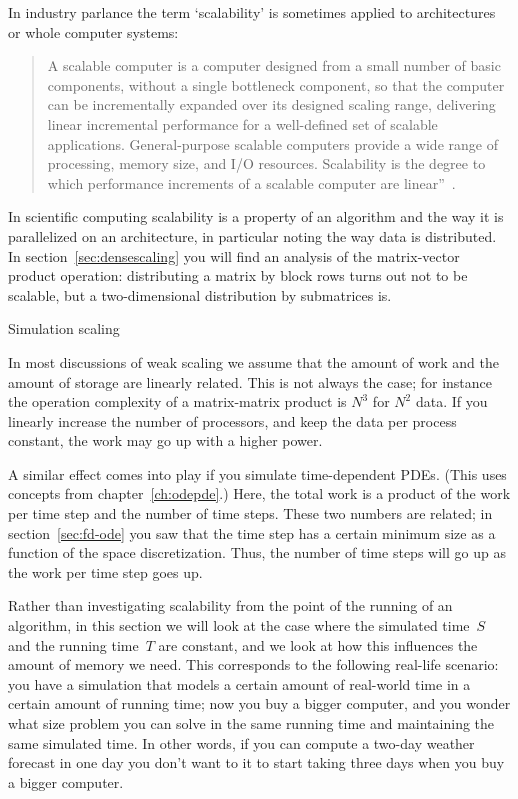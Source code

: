In industry parlance the term `scalability' is sometimes
applied to architectures or whole computer systems:
\begin{quotation}
  A
  scalable computer is a computer designed from a small number of
  basic components, without a single bottleneck component, so that
  the computer can be incrementally expanded over its designed scaling
  range, delivering linear incremental performance for a well-defined
  set of scalable applications.  General-purpose scalable computers
  provide a wide range of processing, memory size, and I/O
  resources.  Scalability is the degree to which performance
  increments of a scalable computer are linear''~\cite{Bell:outlook}.
\end{quotation}
In scientific computing
scalability is a property of an algorithm and the way it is
parallelized on an architecture, in
particular noting the way data is distributed. In
section~\ref{sec:densescaling} you will find an analysis of the
matrix-vector product operation: distributing a matrix by block rows
turns out not to be scalable, but a two-dimensional distribution by
submatrices is.

 {Simulation scaling}

In most discussions of weak scaling
we assume that the amount of work and 
the amount of storage are linearly related. This is not always the case; for instance
the operation complexity of a matrix-matrix product is $N^3$ for $N^2$ data.
If you linearly increase the number of processors, and keep the data
per process constant, the work may go up with a higher power.

A similar effect comes into play if you simulate time-dependent \acp{PDE}.
(This uses concepts from chapter~\ref{ch:odepde}.)
Here, the total work is a product of the work per time step and the number of 
time steps. These two numbers are related; in section~\ref{sec:fd-ode} you
saw that the time step has a certain minimum size as a function of the 
space discretization. Thus, the number of time steps will go up as the work per
time step goes up.

Rather than investigating scalability from the point of the running
of an algorithm, in this section we will look at the case where the simulated time~$S$
and the running time~$T$ are constant, and we look at how this influences the amount of
memory we need. This corresponds to the following real-life scenario: 
you have a simulation that models a certain amount of real-world time 
in a certain amount of running time; now you buy a bigger computer, and you wonder
what size problem you can solve in the same running time and maintaining
the same simulated time. In other words, if you can compute a two-day weather
forecast in one day you don't want to it to start taking three days
when you buy a bigger computer.


